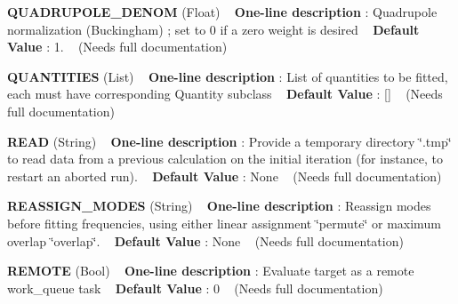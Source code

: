 \begin{DoxyItemize}
\item {\bfseries  Q\+U\+A\+D\+R\+U\+P\+O\+L\+E\+\_\+\+D\+E\+N\+OM } (Float) ~\newline
{\bfseries  One-\/line description }\+: Quadrupole normalization (Buckingham) ; set to 0 if a zero weight is desired ~\newline
{\bfseries  Default Value }\+: 1. ~\newline
(Needs full documentation)\end{DoxyItemize}
\begin{DoxyItemize}
\item {\bfseries  Q\+U\+A\+N\+T\+I\+T\+I\+ES } (List) ~\newline
{\bfseries  One-\/line description }\+: List of quantities to be fitted, each must have corresponding Quantity subclass ~\newline
{\bfseries  Default Value }\+: \mbox{[}\mbox{]} ~\newline
(Needs full documentation)\end{DoxyItemize}
\begin{DoxyItemize}
\item {\bfseries  R\+E\+AD } (String) ~\newline
{\bfseries  One-\/line description }\+: Provide a temporary directory \char`\"{}.\+tmp\char`\"{} to read data from a previous calculation on the initial iteration (for instance, to restart an aborted run). ~\newline
{\bfseries  Default Value }\+: None ~\newline
(Needs full documentation)\end{DoxyItemize}
\begin{DoxyItemize}
\item {\bfseries  R\+E\+A\+S\+S\+I\+G\+N\+\_\+\+M\+O\+D\+ES } (String) ~\newline
{\bfseries  One-\/line description }\+: Reassign modes before fitting frequencies, using either linear assignment \char`\"{}permute\char`\"{} or maximum overlap \char`\"{}overlap\char`\"{}. ~\newline
{\bfseries  Default Value }\+: None ~\newline
(Needs full documentation)\end{DoxyItemize}
\begin{DoxyItemize}
\item {\bfseries  R\+E\+M\+O\+TE } (Bool) ~\newline
{\bfseries  One-\/line description }\+: Evaluate target as a remote work\+\_\+queue task ~\newline
{\bfseries  Default Value }\+: 0 ~\newline
(Needs full documentation)\end{DoxyItemize}
